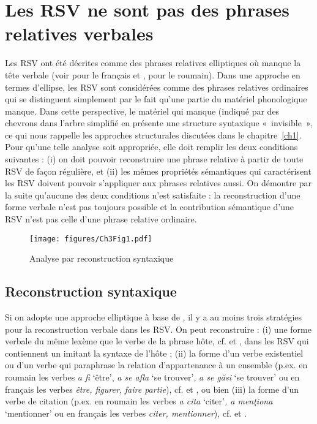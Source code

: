 \section{Les RSV ne sont pas des phrases relatives verbales}\label{ch3:sect3.4}

Les RSV ont été décrites comme des phrases relatives elliptiques où manque la tête verbale (voir \citealt{Grevisse1993} pour le français et \citealt{Gheorghe2004}, \citealt{Gheorghe2005} pour le roumain). Dans une approche en termes d’ellipse, les RSV sont considérées comme des phrases relatives ordinaires qui se distinguent simplement par le fait qu’une partie du matériel phonologique manque. Dans cette perspective, le matériel qui manque (indiqué par des chevrons dans l’arbre simplifié en  présente une structure syntaxique «~invisible~», ce qui nous rappelle les approches structurales discutées dans le chapitre~\ref{ch1}. Pour qu’une telle analyse soit appropriée, elle doit remplir les deux conditions suivantes : (i) on doit pouvoir reconstruire une phrase relative à partir de toute RSV de façon régulière, et (ii) les mêmes propriétés sémantiques qui caractérisent les RSV doivent pouvoir s’appliquer aux phrases relatives aussi. On démontre par la suite qu’aucune des deux conditions n’est satisfaite : la reconstruction d’une forme verbale n’est pas toujours possible et la contribution sémantique d’une RSV n’est pas celle d’une phrase relative ordinaire. 

\begin{figure}
\texttt{[image: figures/Ch3Fig1.pdf]} %
\caption{Analyse par reconstruction syntaxique}
\label{ch3:fig1}
\end{figure} 


\subsection{Reconstruction syntaxique}\label{ch3:sect3.4.1}

Si on adopte une approche elliptique à base de , il y a au moins trois stratégies pour la reconstruction verbale dans les RSV. On peut reconstruire : (i) une forme verbale du même lexème que le verbe de la phrase hôte, cf.  et , dans les RSV qui contiennent un  imitant la syntaxe de l’hôte ; (ii) la forme d’un verbe existentiel ou d’un verbe qui paraphrase la relation d’appartenance à un ensemble (p.ex. en roumain les verbes \textit{a fi} ‘être’, \textit{a se afla} ‘se trouver’, \textit{a se găsi} ‘se trouver’ ou en français les verbes \textit{être, figurer,} \textit{faire partie}), cf.  et , ou bien (iii) la forme d’un verbe de citation (p.ex. en roumain les verbes \textit{a cita} ‘citer’\textit{, a menţiona} ‘mentionner’ ou en français les verbes \textit{citer, mentionner}), cf.  et .

